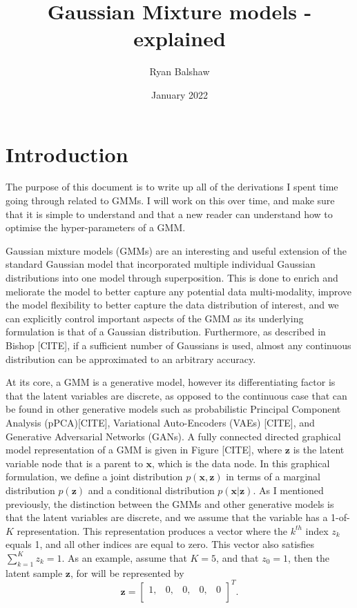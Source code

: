 \documentclass{article}
\title{Gaussian Mixture models - explained}
\author{Ryan Balshaw}
\date{January 2022}
\begin{document}
\maketitle

\section{Introduction}

The purpose of this document is to write up all of the derivations I spent time going through related to GMMs. I will work on this over time, and make sure that it is simple to understand and that a new reader can understand how to optimise the hyper-parameters of a GMM.

Gaussian mixture models (GMMs) are an interesting and useful extension of the standard Gaussian model that incorporated multiple individual Gaussian distributions into one model through superposition. This is done to enrich and meliorate the model to better capture any potential data multi-modality, improve the model flexibility to better capture the data distribution of interest, and we can explicitly control important aspects of the GMM as its underlying formulation is that of a Gaussian distribution. Furthermore, as described in Bishop [CITE], if a sufficient number of Gaussians is used, almost any continuous distribution can be approximated to an arbitrary accuracy.

At its core, a GMM is a generative model, however its differentiating factor is that the latent variables are discrete, as opposed to the continuous case that can be found in other generative models such as probabilistic Principal Component Analysis (pPCA)[CITE], Variational Auto-Encoders (VAEs) [CITE], and Generative Adversarial Networks (GANs). A fully connected directed graphical model representation of a GMM is given in Figure [CITE], where $\mathbf{z}$ is the latent variable node that is a parent to $\mathbf{x}$, which is the data node. In this graphical formulation, we define a joint distribution $p(\mathbf{x}, \mathbf{z})$ in terms of a marginal distribution $p(\mathbf{z})$ and a conditional distribution $p(\mathbf{x}|\mathbf{z})$. As I mentioned previously, the distinction between the GMMs and other generative models is that the latent variables are discrete, and we assume that the variable has a 1-of-$K$ representation. This representation produces a vector where the $k^{th}$ index $z_k$ equals 1, and all other indices are equal to zero. This vector also satisfies $\sum_{k=1}^K z_k = 1$. As an example, assume that $K=5$, and that $z_0 = 1$, then the latent sample $\mathbf{z}$, for will be represented by
\begin{equation}
\mathbf{z} = \begin{bmatrix}
1, & 0, & 0, & 0, & 0 \\
\end{bmatrix}^T.
\end{equation}
\end{document}
